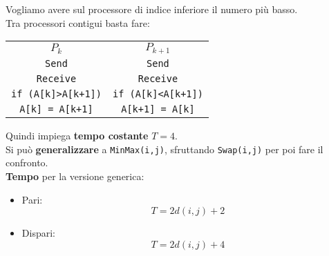 Vogliamo avere sul processore di indice inferiore il numero più basso.\\

Tra processori contigui basta fare:
\begin{center}
	\begin{tabular}{c c}
		$P_k$ & $P_{k+1}$ \\
		\texttt{Send} & \texttt{Send} \\
		\texttt{Receive} & \texttt{Receive} \\
		\texttt{if (A[k]>A[k+1])} & \texttt{if (A[k]<A[k+1])} \\
		\texttt{A[k] = A[k+1]} & \texttt{A[k+1] = A[k]}
	\end{tabular}
\end{center}

Quindi impiega \textbf{tempo costante} $T = 4$.\\

Si può \textbf{generalizzare} a \texttt{MinMax(i,j)}, sfruttando \texttt{Swap(i,j)} per poi fare il confronto.\\

\textbf{Tempo} per la versione generica: 
\begin{itemize}
	\item Pari: 
	$$ T = 2 d(i,j) + 2 $$
	\item Dispari:
	$$ T = 2 d(i,j) + 4 $$
\end{itemize}

